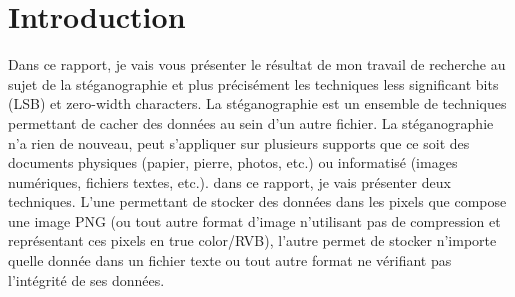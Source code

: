 \newpage
\section{Introduction}
Dans ce rapport, je vais vous présenter le résultat de mon travail de recherche au sujet de la stéganographie et plus précisément les techniques less significant bits (LSB) et zero-width characters.
\newline
La stéganographie est un ensemble de techniques permettant de cacher des données au sein d'un autre fichier. La stéganographie n'a rien de nouveau, peut s'appliquer sur plusieurs supports que ce soit des documents physiques (papier, pierre, photos, etc.) ou informatisé (images numériques, fichiers textes, etc.).
\newline
dans ce rapport, je vais présenter deux techniques. L'une permettant de stocker des données dans les pixels que compose une image PNG (ou tout autre format d'image n'utilisant pas de compression et représentant ces pixels en true color/RVB), l'autre permet de stocker n'importe quelle donnée dans un fichier texte ou tout autre format ne vérifiant pas l'intégrité de ses données. 